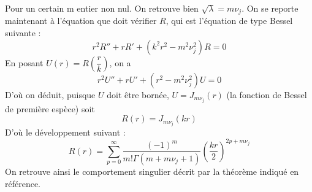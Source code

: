 \documentclass[11pt,a4paper]{article}
\begin{document}
Pour un certain m entier non nul. On retrouve bien $\sqrt{\lambda} = m \nu_j$. On se reporte maintenant à l'équation que doit vérifier $R$, qui est l'équation de type Bessel suivante :
\[r^2R'' + rR' + (k^2r^2 - m^2 \nu_j^2)R = 0\]
En posant $U(r) = R(\dfrac{r}{k})$, on a
\[r^2 U'' + r U' + \left(r^2 - m^2 \nu_j^2\right)U = 0\]
D'où on déduit, puisque $U$ doit être bornée, $U = J_{m \nu_j}(r)$ (la fonction de Bessel de première espèce) soit 
\[R(r) =  J_{m \nu_j}(kr)\]
D'où le développement suivant :
\[R(r) = \sum_{p = 0}^{\infty} \dfrac{(-1)^m}{m!\Gamma(m + m \nu_j +1)}\left(\dfrac{kr}{2}\right)^{2p + m \nu_j}\]
On retrouve ainsi le comportement singulier décrit par la théorème indiqué en référence. 



 

  
\end{document}
